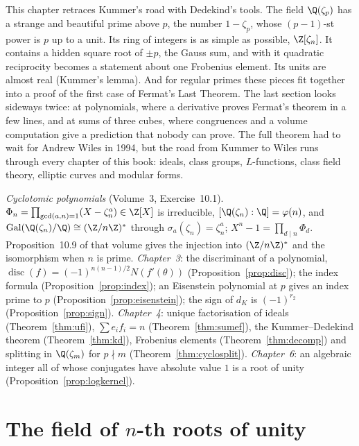 This chapter retraces Kummer's road with Dedekind's tools. The field $\Q(\zeta_p)$ has a strange and beautiful prime above
$p$, the number $1-\zeta_p$, whose $(p-1)$-st power is $p$ up to a unit. Its ring of integers is as simple as possible,
$\Z[\zeta_n]$. It contains a hidden square root of $\pm p$, the Gauss sum, and with it quadratic reciprocity becomes a
statement about one Frobenius element. Its units are almost real (Kummer's lemma). And for regular primes these pieces fit
together into a proof of the first case of Fermat's Last Theorem. The last section looks sideways twice: at polynomials,
where a derivative proves Fermat's theorem in a few lines, and at sums of three cubes, where congruences and a volume
computation give a prediction that nobody can prove. The full theorem had to wait for Andrew Wiles in 1994,
but the road from Kummer to Wiles runs through every chapter of this book: ideals, class groups, $L$-functions, class
field theory, elliptic curves and modular forms.

\begin{reminder}
\emph{Cyclotomic polynomials} (Volume~3, Exercise~10.1). $\Phi_n=\prod_{\gcd(a,n)=1}(X-\zeta_n^a)\in\Z[X]$
is irreducible, $[\Q(\zeta_n):\Q]=\varphi(n)$, and $\operatorname{Gal}(\Q(\zeta_n)/\Q)\cong(\Z/n\Z)^*$ through
$\sigma_a(\zeta_n)=\zeta_n^a$; $X^n-1=\prod_{d\mid n}\Phi_d$. Proposition~10.9 of that volume gives the injection into $(\Z/n\Z)^*$ and the isomorphism when $n$ is prime. \emph{Chapter~3}: the discriminant of a polynomial,
$\operatorname{disc}(f)=(-1)^{n(n-1)/2}N(f'(\theta))$ (Proposition~\ref{prop:disc}); the index formula (Proposition~\ref{prop:index});
an Eisenstein polynomial at $p$ gives an index prime to $p$ (Proposition~\ref{prop:eisenstein}); the sign of $d_K$ is
$(-1)^{r_2}$ (Proposition~\ref{prop:sign}). \emph{Chapter~4}: unique factorisation of ideals (Theorem~\ref{thm:ufi}),
$\sum e_if_i=n$ (Theorem~\ref{thm:sumef}), the Kummer--Dedekind theorem (Theorem~\ref{thm:kd}), Frobenius elements
(Theorem~\ref{thm:decomp}) and splitting in $\Q(\zeta_m)$ for $p\nmid m$ (Theorem~\ref{thm:cyclosplit}). \emph{Chapter~6}: an
algebraic integer all of whose conjugates have absolute value $1$ is a root of unity (Proposition~\ref{prop:logkernel}).
\end{reminder}

\section{The field of $n$-th roots of unity}

